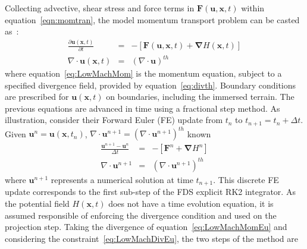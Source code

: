\documentclass[journal,article,atmosphere,submit,moreauthors,pdftex]{Definitions/mdpi}
\begin{document}
Collecting advective, shear stress and force terms in $\mathbf{F}(\mathbf{u},\mathbf{x},t)$ within equation~\ref{eqn:momtran}, the model momentum transport problem can be casted as~\cite{mcgratta_2013}:
%
\begin{eqnarray}
  \frac{\partial \mathbf{u}(\mathbf{x},t)}{\partial t} &=& - \left[ \mathbf{F}(\mathbf{u},\mathbf{x},t) + \boldsymbol{\nabla} H(\mathbf{x},t) \right ]\label{eq:LowMachMom} \\
         \nabla \cdot \mathbf{u} (\mathbf{x},t) & = & \left(\nabla \cdot \mathbf{u} \right)^{th} \label{eq:LowMachDiv}
\end{eqnarray}
%
where equation~\eqref{eq:LowMachMom} is the momentum equation, subject to a specified divergence field, provided by equation~\eqref{eq:divth}. 
Boundary conditions are prescribed for $\mathbf{u}(\mathbf{x},t)$ on boundaries, including the immersed terrain.
The previous equations are advanced in time using a fractional step method. As illustration, consider their Forward Euler (FE) update from $t_n$ to $t_{n+1}=t_n + \Delta t$. Given $ \mathbf{u}^n=\mathbf{u}(\mathbf{x},t_n)$, $\nabla \cdot \mathbf{u}^{n+1} = \left( \nabla \cdot \mathbf{u}^{n+1} \right)^{th}$ known
%
\begin{eqnarray}
  \frac{\mathbf{u}^{n+1}-\mathbf{u}^{n}}{\Delta t} &=& - \left[ \mathbf{F}^n +  \boldsymbol{\nabla} H^n \right] \label{eq:LowMachMomEu}\\
  \nabla \cdot \mathbf{u}^{n+1} &=& \left( \nabla \cdot \mathbf{u}^{n+1} \right)^{th} \label{eq:LowMachDivEu}
\end{eqnarray}
%
where $\mathbf{u}^{n+1}$ represents a numerical solution at time $t_{n+1}$. This discrete FE update corresponds to the first sub-step of the FDS explicit RK2 integrator. As the potential field $H(\mathbf{x},t)$ does not have a time evolution equation, it is assumed responsible of enforcing the divergence condition and used on the projection step. Taking the divergence of equation~\eqref{eq:LowMachMomEu} and considering  the constraint~\eqref{eq:LowMachDivEu}, the two steps of the method are
%
\end{document}
